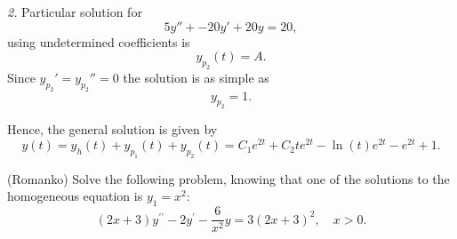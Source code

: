 \documentclass[11pt]{article}
\begin{document}
\begin{solution}
\par \textsl{2.} Particular solution for
\[5y'' + -20 y' +20 y = 20,\] using undetermined coefficients is
\begin{equation*}
     y_{p_{2}}(t)=A.
\end{equation*}
Since $y_{p_{2}}'=y_{p_{2}}''=0$ the solution is as simple as \[y_{p_{2}}=1.\]

Hence, the general solution is given by
\begin{equation*}
\boxed{y(t) = y_{h}(t) + y_{p_{1}}(t) + y_{p_{2}}(t) =C_{1}e^{2t}+C_{2}te^{2t} -\ln (t)e^{2t} - e^{2t} + 1 }.
\end{equation*}
\end{solution}



\begin{problem}
(Romanko) Solve the following problem, knowing that one of the solutions to
the homogeneous equation is $y_1 = x^2$:
\begin{equation*}     
  \left( 2x + 3 \right) y^{\prime \prime} - 2 y^{\prime} - \frac {6} {x^2} y
  = 3 \left( 2x + 3 \right)^2, \quad x>0.
\end{equation*}
\end{problem}
\end{document}

